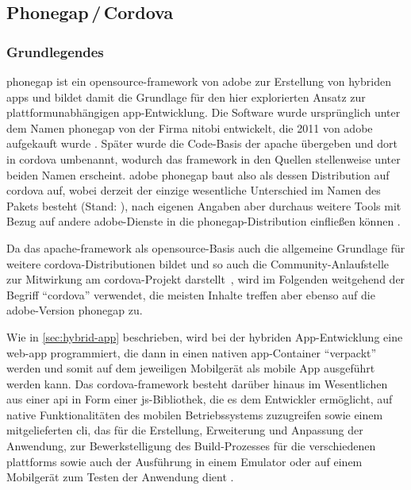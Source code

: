 \subsection{Phonegap\,/\,Cordova} \label{sec:cordova}


\subsubsection{Grundlegendes} \label{sec:cordova-grundlegendes}

\gls{phonegap} ist ein \gls{opensource}-\gls{framework} von \gls{adobe} zur Erstellung von hybriden \glspl{app} und bildet damit die Grundlage für den hier explorierten Ansatz zur plattformunabhängigen \gls{app}-Entwicklung.
Die Software wurde ursprünglich unter dem Namen \gls{phonegap} von der Firma \gls{nitobi} entwickelt, die 2011 von \gls{adobe} aufgekauft wurde \cite{Adobe_Announces_Agreement_to_Acquire_Nitobi_Creator_of_PhoneGap}. 
Später wurde die Code-Basis der \gls{apache} übergeben und dort in \gls{cordova} umbenannt, wodurch das \gls{framework} in den Quellen stellenweise unter beiden Namen erscheint.
\Gls{adobe} \gls{phonegap} baut also als dessen Distribution auf \gls{cordova} auf, wobei derzeit der einzige wesentliche Unterschied im Namen des Pakets besteht (Stand: ), nach eigenen Angaben aber durchaus weitere Tools mit Bezug auf andere \gls{adobe}-Dienste in die \gls{phonegap}-Distribution einfließen können \cite{PhoneGap_Cordova_and_whats_in_a_name}.

Da das \gls{apache}-\gls{framework} als \gls{opensource}-Basis auch die allgemeine Grundlage für weitere \gls{cordova}-Distributionen bildet und so auch die Community-Anlaufstelle zur Mitwirkung am \gls{cordova}-Projekt darstellt~\cite{PhoneGap_Cordova_and_whats_in_a_name}, wird im Folgenden weitgehend der Begriff \enquote{\gls{cordova}} verwendet, die meisten Inhalte treffen aber ebenso auf die \gls{adobe}-Version \gls{phonegap} zu. 


Wie in \autoref{sec:hybrid-app} beschrieben, wird bei der hybriden App-Entwicklung eine \gls{web-app} programmiert, die dann in einen nativen \gls{app}-Container \enquote{verpackt} werden und somit auf dem jeweiligen Mobilgerät als mobile App ausgeführt werden kann. 
Das \gls{cordova}-\gls{framework} besteht darüber hinaus im Wesentlichen aus einer \gls{api} in Form einer \gls{js}-Bibliothek, die es dem Entwickler ermöglicht, auf native Funktionalitäten des mobilen Betriebssystems zuzugreifen sowie einem mitgelieferten \gls{cli}, das für die Erstellung, Erweiterung und Anpassung der Anwendung, zur Bewerkstelligung des Build-Prozesses für die verschiedenen \glspl{plattform} sowie auch der Ausführung in einem Emulator oder auf einem Mobilgerät zum Testen der Anwendung dient \cite{Cordova-Docs_Overview}.

